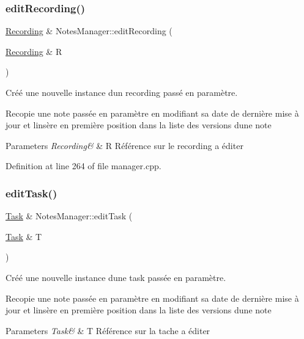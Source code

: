 \subsubsection{\texorpdfstring{edit\+Recording()}{editRecording()}}
{\footnotesize\ttfamily \hyperlink{class_recording}{Recording} \& Notes\+Manager\+::edit\+Recording (\begin{DoxyParamCaption}\item[{\hyperlink{class_recording}{Recording} \&}]{R }\end{DoxyParamCaption})}



Créé une nouvelle instance d\textquotesingle{}un recording passé en paramètre. 

Recopie une note passée en paramètre en modifiant sa date de dernière mise à jour et l\textquotesingle{}insère en première position dans la liste des versions d\textquotesingle{}une note 
\begin{DoxyParams}{Parameters}
{\em Recording\&} & R Référence sur le recording a éditer \\
\hline
\end{DoxyParams}


Definition at line 264 of file manager.\+cpp.

\mbox{\label{class_notes_manager_a8f8f2b6aaa8c7d41356f9e4be7da2da5}} 
\subsubsection{\texorpdfstring{edit\+Task()}{editTask()}}
{\footnotesize\ttfamily \hyperlink{class_task}{Task} \& Notes\+Manager\+::edit\+Task (\begin{DoxyParamCaption}\item[{\hyperlink{class_task}{Task} \&}]{T }\end{DoxyParamCaption})}



Créé une nouvelle instance d\textquotesingle{}une task passée en paramètre. 

Recopie une note passée en paramètre en modifiant sa date de dernière mise à jour et l\textquotesingle{}insère en première position dans la liste des versions d\textquotesingle{}une note 
\begin{DoxyParams}{Parameters}
{\em Task\&} & T Référence sur la tache a éditer \\
\hline
\end{DoxyParams}



